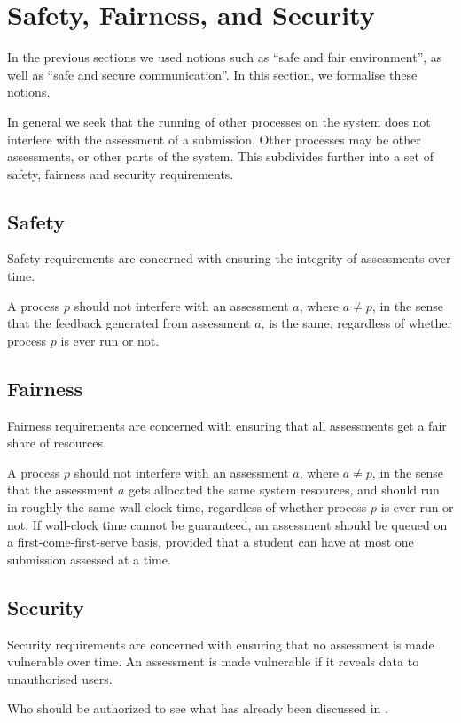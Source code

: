 
\section{Safety, Fairness, and Security}

In the previous sections we used notions such as ``safe and fair environment'',
as well as ``safe and secure communication''. In this section, we formalise
these notions.

In general we seek that the running of other processes on the system does not
interfere with the assessment of a submission. Other processes may be other
assessments, or other parts of the system. This subdivides further into a set
of safety, fairness and security requirements.



\subsection{Safety}

Safety requirements are concerned with ensuring the integrity of assessments
over time.

A process $p$ should not interfere with an assessment $a$, where $a\neq p$, in
the sense that the feedback generated from assessment $a$, is the same,
regardless of whether process $p$ is ever run or not.

\subsection{Fairness}

Fairness requirements are concerned with ensuring that all assessments get a
fair share of resources.

A process $p$ should not interfere with an assessment $a$, where $a\neq p$, in
the sense that the assessment $a$ gets allocated the same system resources, and
should run in roughly the same wall clock time, regardless of whether process
$p$ is ever run or not. If wall-clock time cannot be guaranteed, an assessment
should be queued on a first-come-first-serve basis, provided that a student can
have at most one submission assessed at a time.

\subsection{Security}

Security requirements are concerned with ensuring that no assessment is made
vulnerable over time. An assessment is made vulnerable if it reveals data to
unauthorised users.

Who should be authorized to see what has already been discussed in
.
